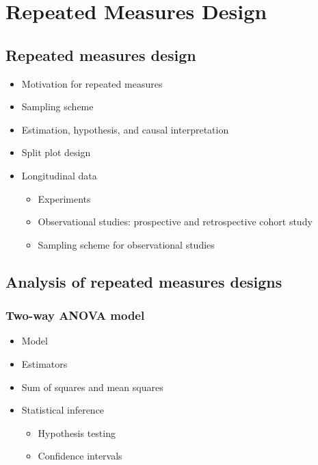 \documentclass[12pt,]{book}
\providecommand{\tightlist}{%
  \setlength{\itemsep}{0pt}\setlength{\parskip}{0pt}}
\begin{document}
\chapter{Repeated Measures Design}\label{ch:repeated}

\section{Repeated measures design}\label{repeated-measures-design}

\begin{itemize}
\tightlist
\item
  Motivation for repeated measures
\item
  Sampling scheme
\item
  Estimation, hypothesis, and causal interpretation
\item
  Split plot design
\item
  Longitudinal data

  \begin{itemize}
  \tightlist
  \item
    Experiments
  \item
    Observational studies: prospective and retrospective cohort study
  \item
    Sampling scheme for observational studies
  \end{itemize}
\end{itemize}

\section{Analysis of repeated measures
designs}\label{analysis-of-repeated-measures-designs}

\subsection{Two-way ANOVA model}\label{two-way-anova-model}

\begin{itemize}
\tightlist
\item
  Model
\item
  Estimators
\item
  Sum of squares and mean squares
\item
  Statistical inference

  \begin{itemize}
  \tightlist
  \item
    Hypothesis testing
  \item
    Confidence intervals
  \end{itemize}
\end{itemize}
\end{document}
